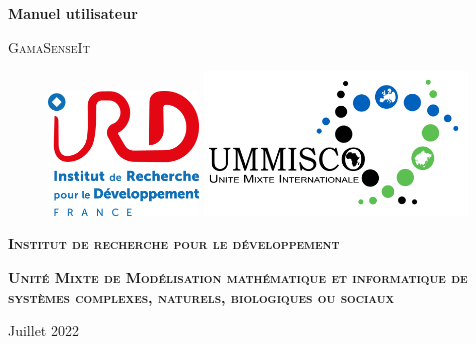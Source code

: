 
\begin{titlepage}
    \centering


    \vspace{10cm}
    {\huge\bfseries Manuel utilisateur\par}
    \vspace{1cm}
    {\scshape\LARGE GamaSenseIt \par}

    \vspace{2cm}


    \begin{figure}[H]
        \begin{center}
            \href{https://www.ird.fr}{\includegraphics[width=4cm]{resources/ird.png}}
            \hspace{0.5cm}
            \href{https://www.ummisco.fr}{\includegraphics[width=7cm]{resources/ummisco.png}}
        \end{center}
    \end{figure}

    \vspace{2cm}

    {\scshape\Large\bfseries Institut de recherche pour le développement\par}
    \vspace{1cm}
    {\scshape\bfseries Unité Mixte de Modélisation mathématique et informatique de systèmes complexes, naturels, biologiques ou sociaux\par}

    \vfill

    \large Juillet 2022

\end{titlepage}
